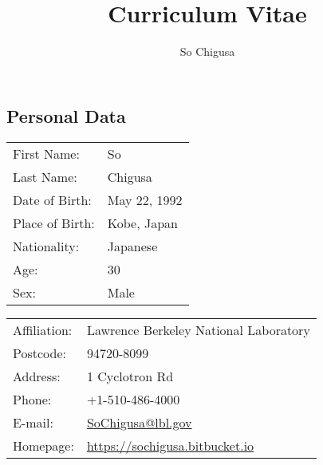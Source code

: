 \documentclass[12pt]{article}
\title{\vspace{-2cm}\textbf{Curriculum Vitae}}
\author{So Chigusa}
\begin{document}
\large
\maketitle

\newcommand{\lsim}{\stackrel{<}{_\sim}}
\newcommand{\gsim}{\stackrel{>}{_\sim}}

\newcommand{\rem}[1]{{$\spadesuit$\bf #1$\spadesuit$}}


\renewcommand{\thefootnote}{\arabic{footnote})}
\setcounter{footnote}{0}

\vspace{-5mm}
\subsection*{Personal Data}

\vspace{-3mm}

\begin{table}[h]
 \begin{tabular}{ll}
  First Name: & So %
      \\
  Last Name: & Chigusa %
      \\
  Date of Birth: & May 22, 1992 \\
  Place of Birth: & Kobe, Japan \\
  Nationality: & Japanese \\
  Age: & 30 \\
  Sex: & Male \\
 \end{tabular}
\end{table}

\vspace{-5mm}
\begin{table}[h]
 \begin{tabular}{ll}
  Affiliation: & Lawrence Berkeley National Laboratory \\
  Postcode: & 94720-8099 \\
  Address: & 1 Cyclotron Rd \\
  Phone: & +1-510-486-4000 \\
  E-mail: &
      \href{mailto:SoChigusa@lbl.gov}{SoChigusa@lbl.gov}
      \\
  Homepage: & \url{https://sochigusa.bitbucket.io} \\
 \end{tabular}
\end{table}
\vspace{-5mm}
\end{document}
